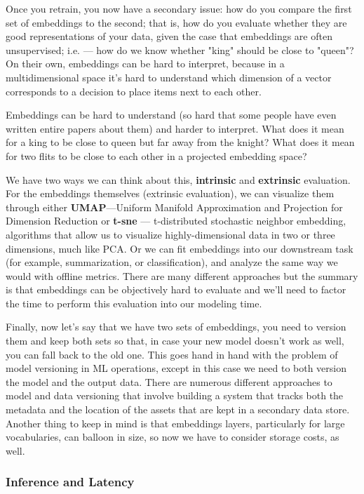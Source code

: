 \documentclass[11pt, table]{diazessay} %
\begin{document}
\begin{sloppypar}
Once you retrain, you now have a secondary issue: how do you compare the first set of embeddings to the second; that is, how do you evaluate whether they are good representations of your data, given the case that embeddings are often unsupervised; i.e. --- how do we know whether "king" should be close to "queen"? On their own, embeddings can be hard to interpret, because in a multidimensional space it's hard to understand which dimension of a vector corresponds to a decision to place items next to each other\citep{simhi2022interpreting}.  

Embeddings can be hard to understand (so hard that some people have even written entire papers about them) and harder to interpret. What does it mean for a king to be close to queen but far away from the knight? What does it mean for two flits to be close to each other in a projected embedding space?  

We have two ways we can think about this, \textbf{intrinsic} and \textbf{extrinsic} evaluation. For the embeddings themselves (extrinsic evaluation), we can visualize them through either \textbf{UMAP}---Uniform Manifold Approximation and Projection for Dimension Reduction or \textbf{t-sne} --- t-distributed stochastic neighbor embedding, algorithms that allow us to visualize highly-dimensional data in two or three dimensions, much like PCA. Or we can fit embeddings into our downstream task (for example, summarization, or classification), and analyze the same way we would with offline metrics. There are many different approaches
\citep{wang2019evaluating} but the summary is that embeddings can be objectively hard to evaluate and we'll need to factor the time to perform this evaluation into our modeling time.

Finally, now let's say that we have two sets of embeddings, you need to version them and keep both sets so that, in case your new model doesn't work as well, you can fall back to the old one. This goes hand in hand with the problem of model versioning in ML operations, except in this case we need to both version the model and the output data. There are numerous different approaches to model and data versioning that involve building a system that tracks both the metadata and the location of the assets that are kept in a secondary data store. Another thing to keep in mind is that embeddings layers, particularly for large vocabularies, can balloon in size, so now we have to consider storage costs, as well.


\subsubsection{Inference and Latency}


\end{sloppypar}
\end{document}
